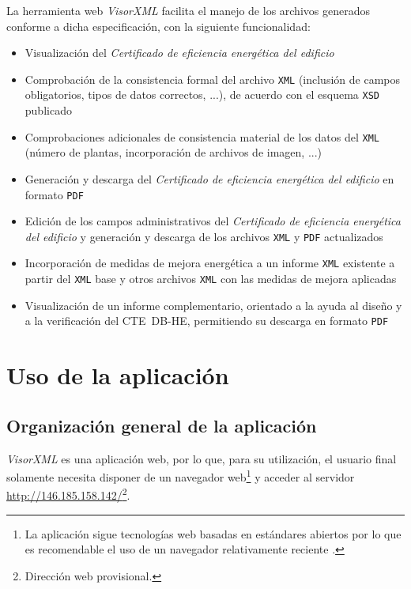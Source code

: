 \documentclass[10pt,notitlepage,oneside,a4paper]{article}
\begin{document}
La herramienta web \textit{VisorXML} facilita el manejo de los archivos generados conforme a dicha especificación, con la siguiente funcionalidad:

\begin{itemize}
\item Visualización del \textit{Certificado de eficiencia energética del edificio}
\item Comprobación de la consistencia formal del archivo \texttt{XML} (inclusión de campos obligatorios, tipos de datos correctos, ...), de acuerdo con el esquema \texttt{XSD} publicado
\item Comprobaciones adicionales de consistencia material de los datos del \texttt{XML} (número de plantas, incorporación de archivos de imagen, ...)
\item Generación y descarga del \textit{Certificado de eficiencia energética del edificio} en formato \texttt{PDF}
\item Edición de los campos administrativos del \textit{Certificado de eficiencia energética del edificio} y generación y descarga de los archivos \texttt{XML} y \texttt{PDF} actualizados
\item Incorporación de medidas de mejora energética a un informe \texttt{XML} existente a partir del \texttt{XML} base y otros archivos \texttt{XML} con las medidas de mejora aplicadas
\item Visualización de un informe complementario, orientado a la ayuda al diseño y a la verificación del CTE~DB-HE, permitiendo su descarga en formato \texttt{PDF}
\end{itemize}

\section{Uso de la aplicación}
\label{sec:usoprograma}

\subsection{Organización general de la aplicación}

\textit{VisorXML} es una aplicación web, por lo que, para su utilización, el usuario final solamente necesita disponer de un navegador web\footnote{La aplicación sigue tecnologías web basadas en estándares abiertos por lo que es recomendable el uso de un navegador relativamente reciente .} y acceder al servidor \href{http://146.185.158.142/}{http://146.185.158.142/}\footnote{Dirección web provisional.}.
\end{document}
